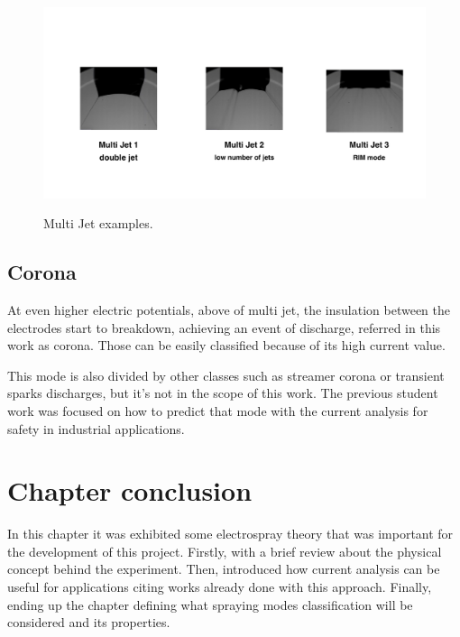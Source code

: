   \begin{figure}[H]
      \center
      \includegraphics[width=15cm]{Figuras/april/multjt.png}
      \label{fig:multijt}
      \caption{Multi Jet examples.}
  \end{figure}



\subsection{Corona}
\label{subsec:Corona}

At even higher electric potentials, above of multi jet, the insulation between the electrodes start to breakdown, achieving an event of discharge, referred in this work as corona.
Those can be easily classified because of its high current value. 

This mode is also divided by other classes such as streamer corona or transient sparks discharges, but it's not in the scope of this work. 
The previous student work was focused on how to predict that mode with the current analysis for safety in industrial applications.



\section{Chapter conclusion}

In this chapter it was exhibited some electrospray theory that was important for the development of this project. 
Firstly, with a brief review about the physical concept behind the experiment. 
Then, introduced how current analysis can be useful for applications citing works already done with this approach.
Finally, ending up the chapter defining what spraying modes classification will be considered and its properties.

\clearpage
